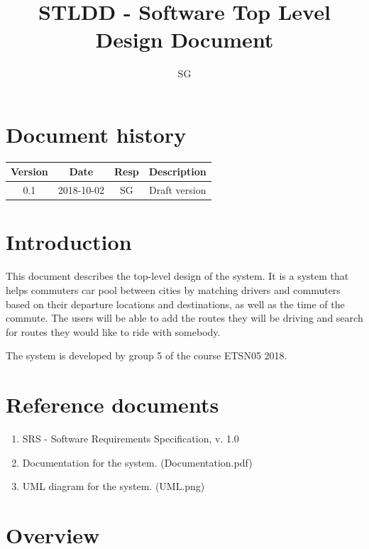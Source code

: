 \documentclass{article}
\title{STLDD - Software Top Level Design Document}
\begin{document}
\author{SG}

\maketitle
\thispagestyle{fancy}
\tableofcontents
\newpage
\maketitle

\section*{Document history}
 \begin{tabular}{||c c c c||} 
 \hline
 Version & Date & Resp & Description \\ [0.5ex]
 \hline\hline
 0.1 & 2018-10-02 & SG & Draft version \\
 \hline
 

\end{tabular}

\section{Introduction}
This document describes the top-level design of the system. It is a system that helps commuters car pool between cities by matching drivers and commuters based on their departure locations and destinations, as well as the time of the commute. The users will be able to add the routes they will be driving and search for routes they would like to ride with somebody.

The system is developed by group 5 of the course ETSN05 2018.

\section{Reference documents}

\begin{enumerate}
    \item SRS - Software Requirements Specification, v. 1.0
    \item Documentation for the system. (Documentation.pdf)
    \item UML diagram for the system. (UML.png)
\end{enumerate}

\section{Overview}
\end{document}
